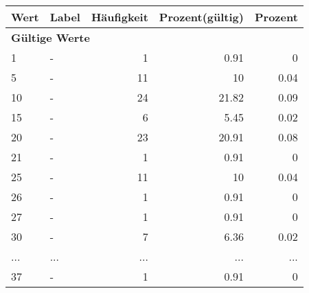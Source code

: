      \begin{longtable}{lXrrr}
     \toprule
     \textbf{Wert} & \textbf{Label} & \textbf{Häufigkeit} & \textbf{Prozent(gültig)} & \textbf{Prozent} \\
     \endhead
     \midrule
     \multicolumn{5}{l}{\textbf{Gültige Werte}}\\
        1 & \multicolumn{1}{X}{-} & %
          \num{1} &
          \num[round-mode=places,round-precision=2]{0,91} &
          \num[round-mode=places,round-precision=2]{0} \\
        5 & \multicolumn{1}{X}{-} & %
          \num{11} &
          \num[round-mode=places,round-precision=2]{10} &
          \num[round-mode=places,round-precision=2]{0,04} \\
        10 & \multicolumn{1}{X}{-} & %
          \num{24} &
          \num[round-mode=places,round-precision=2]{21,82} &
          \num[round-mode=places,round-precision=2]{0,09} \\
        15 & \multicolumn{1}{X}{-} & %
          \num{6} &
          \num[round-mode=places,round-precision=2]{5,45} &
          \num[round-mode=places,round-precision=2]{0,02} \\
        20 & \multicolumn{1}{X}{-} & %
          \num{23} &
          \num[round-mode=places,round-precision=2]{20,91} &
          \num[round-mode=places,round-precision=2]{0,08} \\
        21 & \multicolumn{1}{X}{-} & %
          \num{1} &
          \num[round-mode=places,round-precision=2]{0,91} &
          \num[round-mode=places,round-precision=2]{0} \\
        25 & \multicolumn{1}{X}{-} & %
          \num{11} &
          \num[round-mode=places,round-precision=2]{10} &
          \num[round-mode=places,round-precision=2]{0,04} \\
        26 & \multicolumn{1}{X}{-} & %
          \num{1} &
          \num[round-mode=places,round-precision=2]{0,91} &
          \num[round-mode=places,round-precision=2]{0} \\
        27 & \multicolumn{1}{X}{-} & %
          \num{1} &
          \num[round-mode=places,round-precision=2]{0,91} &
          \num[round-mode=places,round-precision=2]{0} \\
        30 & \multicolumn{1}{X}{-} & %
          \num{7} &
          \num[round-mode=places,round-precision=2]{6,36} &
          \num[round-mode=places,round-precision=2]{0,02} \\
       ... & ... & ... & ... & ... \\
        37 & \multicolumn{1}{X}{-} & %
          \num{1} &
          \num[round-mode=places,round-precision=2]{0,91} &
          \num[round-mode=places,round-precision=2]{0} \\


\end{longtable}
